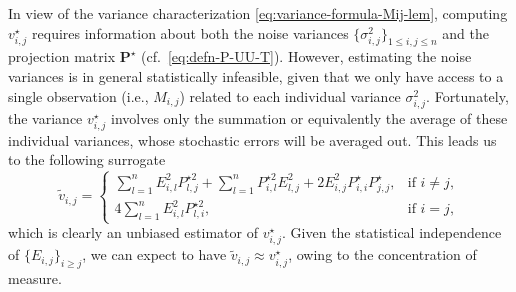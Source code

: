 In view of the variance characterization \eqref{eq:variance-formula-Mij-lem}, 
computing ${v}_{i,j}^{\star}$ requires information about both the noise variances $\{\sigma_{i,j}^2\}_{1\leq i,j\leq n}$ and the projection matrix $\bm{P}^{\star}$ (cf.~\eqref{eq:defn-P-UU-T}). However, estimating the noise variances is in general statistically infeasible, given that we only have access to a single observation (i.e., $M_{i,j}$) related to each individual variance $\sigma_{i,j}^2$.  Fortunately, the variance  ${v}_{i,j}^{\star}$ involves only the summation or equivalently the average of these individual variances, whose stochastic errors will be averaged out.  This leads us to the following surrogate
%
\begin{equation}
	\widetilde{v}_{i,j}=\begin{cases}
		\sum_{l=1}^{n}{E}_{i,l}^{2}{P}_{l,j}^{\star 2}+\sum_{l=1}^{n}{P}_{i,l}^{\star 2}{E}_{l,j}^{2}+2{E}_{i,j}^{2}{P}^{\star}_{i,i}{P}_{j,j}^{\star}, & \text{if }i\neq j,\\
	4\sum_{l=1}^{n}{E}_{i,l}^{2}{P}_{l,i}^{\star 2}, & \text{if }i=j, 
\end{cases}
	\label{eq:v-ij-plugin-surrogate-123}
\end{equation}
%
which is clearly an unbiased estimator of ${v}_{i,j}^{\star}$. 
Given the statistical independence of $\{E_{i,j}\}_{i\geq j}$, 
we can expect to have $\widetilde{v}_{i,j}\approx v_{i,j}^{\star}$, owing to the concentration of measure.  






